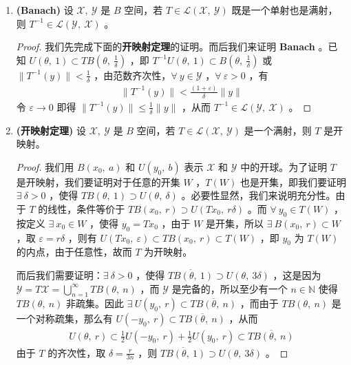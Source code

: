\begin{enumerate}[leftmargin=2cm, label=\arabic*]
\begin{proof}
			$\forall\ f\in A_n$ ，$\forall\ \varepsilon > 0$ ，由 Weierstrass 逼近定理，存在多项式 $p$ ，使得 $\|f-p\| < \frac{\varepsilon}{2}$ ，$p$ 的导数在 $[0,\ 1]$ 上是有界的，因此根据中值定理，$\exists\ M>0$ ，使得对 $\forall\ s\in[0,\ 1]$ ，以及 $|h|<\frac{1}{n}$ ，使得 $|p(s+h) - p(s)| \leqslant M|h|$ 。设 $g(s)\in C[0,\ 1]$ 是一个分段线性函数，满足 $\|g\|<\frac{\varepsilon}{2}$ ，并且各条线段的线段斜率的绝对值都大于 $M+n$ ，那么 $p+g\in B(f,\ \varepsilon)$ ，而 $p+g\notin A_n$ ，故而每个 $A_n$ 都是疏集，则 $\mathscr{X}$ 是第二纲集。
		\end{proof}
		\item \textbf{(Banach)} 设 $\mathscr{X},\ \mathscr{Y}$ 是 $B$ 空间，若 $T\in\mathscr{L}(\mathscr{X},\ \mathscr{Y})$ 既是一个单射也是满射，则 $T^{-1}\in\mathscr{L}(\mathscr{Y},\ \mathscr{X})$ 。
		\begin{proof}
			我们先完成下面的\textbf{开映射定理}的证明。而后我们来证明 \textbf{Banach} 。已知 $U(\theta,\ 1)\subset TB(\theta,\ \frac{1}{\delta})$ ，即 $T^{-1} U(\theta,\ 1)\subset B(\theta,\ \frac{1}{\delta})$ 或 $\|T^{-1}(y)\| < \frac{1}{\delta}$ ，由范数齐次性，$\forall\ y\in\mathscr{Y}$ ，$\forall\ \varepsilon > 0$ ，有
			\begin{align*}
				\|T^{-1}(y)\| < \frac{(1+\varepsilon)}{\delta} \|y\|
			\end{align*}
			令 $\varepsilon\to 0$ 即得 $\|T^{-1}(y)\| \leqslant \frac{1}{\delta} \|y\|$ ，从而 $T^{-1}\in\mathscr{L}(\mathscr{Y},\ \mathscr{X})$ 。
		\end{proof}
		\item \textbf{(开映射定理)} 设 $\mathscr{X},\ \mathscr{Y}$ 是 $B$ 空间，若 $T\in\mathscr{L}(\mathscr{X},\ \mathscr{Y})$ 是一个满射，则 $T$ 是开映射。
		\begin{proof}
			我们用 $B(x_0,\ a)$ 和 $U(y_0,\ b)$ 表示 $\mathscr{X}$ 和 $\mathscr{Y}$ 中的开球。为了证明 $T$ 是开映射，我们要证明对于任意的开集 $W$ ，$T(W)$ 也是开集，即我们要证明 $\exists\ \delta>0$ ，使得 $TB(\theta,\ 1)\supset U(\theta,\ \delta)$ 。必要性显然，我们来说明充分性。由于 $T$ 的线性，条件等价于 $TB(x_0,\ r)\supset U(Tx_0,\ r\delta)$ 。而 $\forall\ y_0\in T(W)$ ，按定义 $\exists\ x_0\in W$ ，使得 $y_0 = Tx_0$ ，由于 $W$ 是开集，所以 $\exists\ B(x_0,\ r)\subset W$ ，取 $\varepsilon = r\delta$ ，则有 $U(Tx_0,\ \varepsilon)\subset TB(x_0,\ r)\subset T(W)$ ，即 $y_0$ 为 $T(W)$ 的内点，由于任意性，故而 $T$ 为开映射。
			
			而后我们需要证明：$\exists\ \delta>0$ ，使得 $\overline{TB(\theta,\ 1)} \supset U(\theta,\ 3\delta)$ ，这是因为 $\mathscr{Y} = T\mathscr{X} = \bigcup\limits_{n=1}^{\infty} TB(\theta,\ n)$ ，而 $\mathscr{Y}$ 是完备的，所以至少有一个 $n\in\mathbb{N}$ 使得 $TB(\theta,\ n)$ 非疏集。因此 $\exists\ U(y_0,\ r)\subset \overline{TB(\theta,\ n)}$ ，而由于 $TB(\theta,\ n)$ 是一个对称疏集，那么有 $U(-y_0,\ r)\subset \overline{TB(\theta,\ n)}$ ，从而 
			\begin{align*}
				U(\theta,\ r)\subset \frac{1}{2}U(-y_0,\ r) + \frac{1}{2}U(y_0,\ r)\subset \overline{TB(\theta,\ n)}
			\end{align*}
			由于 $T$ 的齐次性，取 $\delta = \frac{r}{3n}$ ，则 $\overline{TB(\theta,\ 1)}\supset U(\theta,\ 3\delta)$ 。
			

\end{proof}
\end{enumerate}
